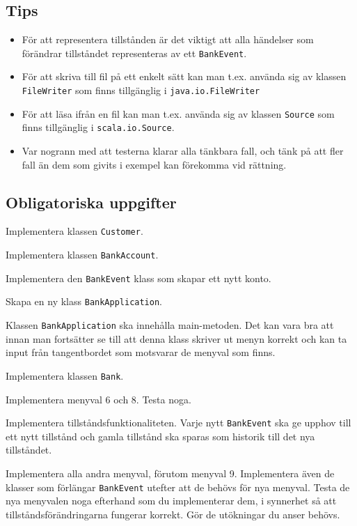 \subsection{Tips} 

\begin{itemize}
\item För att representera tillstånden är det viktigt att alla händelser som förändrar tillståndet representeras av ett \texttt{BankEvent}.

\item För att skriva till fil på ett enkelt sätt kan man t.ex. använda sig av klassen \texttt{FileWriter} som finns tillgänglig i \texttt{java.io.FileWriter}

\item För att läsa ifrån en fil kan man t.ex. använda sig av klassen \texttt{Source} som finns tillgänglig i \texttt{scala.io.Source}. 

\item Var nogrann med att testerna klarar alla tänkbara fall, och tänk på att fler fall än dem som givits i exempel kan förekomma vid rättning.
\end{itemize}

\subsection{Obligatoriska uppgifter}

\Task Implementera klassen \texttt{Customer}.

\Task Implementera klassen \texttt{BankAccount}.

\Task Implementera den \texttt{BankEvent} klass som skapar ett nytt konto.

\Task Skapa en ny klass \texttt{BankApplication}.

\Subtask Klassen \texttt{BankApplication} ska innehålla main-metoden. Det kan vara bra att innan man fortsätter se till att denna klass skriver ut menyn korrekt och kan ta input från tangentbordet som motsvarar de menyval som finns.

\Task Implementera klassen \texttt{Bank}.

\Subtask Implementera menyval 6 och 8. Testa noga.

\Subtask Implementera tillståndsfunktionaliteten. Varje nytt \texttt{BankEvent} ska ge upphov till ett nytt tillstånd och gamla tillstånd ska sparas som historik till det nya tillståndet.

\Subtask Implementera alla andra menyval, förutom menyval 9. Implementera även de klasser som förlängar \texttt{BankEvent} utefter att de behövs för nya menyval.
Testa de nya menyvalen noga efterhand som du implementerar dem, i synnerhet så att tillståndsförändringarna fungerar korrekt. Gör de utökningar du anser behövs. 

